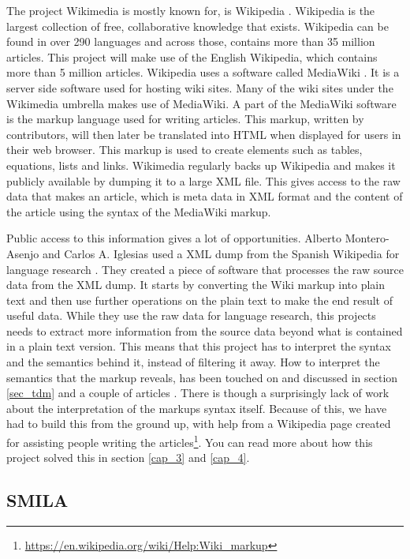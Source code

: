 The project Wikimedia is mostly known for, is Wikipedia \cite{wikipedia}. Wikipedia is the largest collection of free, collaborative knowledge that exists. Wikipedia can be found in over 290 languages and across those, contains more than 35 million articles. This project will make use of the English Wikipedia, which contains more than 5 million articles. Wikipedia uses a  software called MediaWiki \cite{mediawiki}. It is a server side software used for hosting wiki sites. Many of the wiki sites under the Wikimedia umbrella makes use of MediaWiki. A part of the MediaWiki software is the markup language used for writing articles. This markup, written by contributors, will then later be translated into HTML when displayed for users in their web browser. This markup is used to create elements such as tables, equations, lists and links. Wikimedia regularly backs up Wikipedia and makes it publicly available by dumping it to a large XML file. This gives access to the raw data that makes an article, which is meta data in XML format and the content of the article using the syntax of the MediaWiki markup. 

Public access to this information gives a lot of opportunities. Alberto Montero-Asenjo and Carlos A. Iglesias used a XML dump from the Spanish Wikipedia for language research \cite{lr-wiki}. They created a piece of software that processes the raw source data from the XML dump. It starts by converting the Wiki markup into plain text and then use further operations on the plain text to make the end result of useful data. While they use the raw data for language research, this projects needs to extract more information from the source data beyond what is contained in a plain text version. %
This means that this project has to interpret the syntax and the semantics behind it, instead of filtering it away.
How to interpret the semantics that the markup reveals, has been touched on and discussed in section \ref{sec_tdm} and a couple of articles \cite{text-cat} \cite{wlm}. There is though a surprisingly lack of work about the interpretation of the markups syntax itself. Because of this, we have had to build this from the ground up, with help from a Wikipedia page created for assisting people writing the articles\footnote{\url{https://en.wikipedia.org/wiki/Help:Wiki_markup}}. You can read more about how this project solved this in section \ref{cap_3} and \ref{cap_4}.



\subsection{SMILA} \label{smila}


